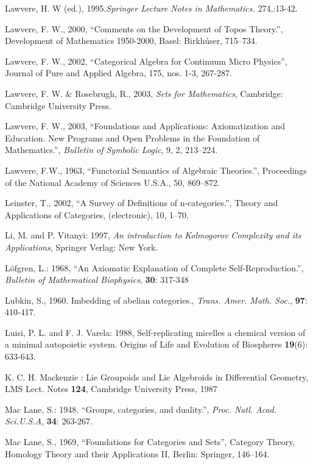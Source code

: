 \documentclass[12pt]{article}
\theoremstyle{plain}
\theoremstyle{definition}
\numberwithin{equation}{section}
\begin{document}
\begin{thebibliography}{99}
Lawvere, H. W (ed.), 1995.{\em Springer Lecture Notes in Mathematics.} 274,:13-42. 

Lawvere, F. W., 2000, ``Comments on the Development of Topos Theory.'', Development of Mathematics 1950-2000, Basel: Birkh\'user, 715--734. 

Lawvere, F. W., 2002, ``Categorical Algebra for Continuum Micro Physics'', Journal of Pure and Applied Algebra, 175, nos. 1-3, 267-287. 

Lawvere, F. W. \& Rosebrugh, R., 2003, {\em Sets for Mathematics}, Cambridge: Cambridge University Press.  

Lawvere, F. W., 2003, ``Foundations and Applications: Axiomatization and Education. New Programs and Open Problems in the Foundation of Mathematics.'', {\em Bulletin of Symbolic Logic}, 9, 2, 213--224. 

Lawvere, F.W., 1963, ``Functorial Semantics of Algebraic Theories.'', Proceedings of the National Academy of Sciences U.S.A., 50, 869--872. 

Leinster, T., 2002, ``A Survey of Definitions of n-categories.'', Theory and Applications of Categories, (electronic), 10, 1--70. 

Li, M. and P. Vitanyi: 1997, \emph{An introduction to Kolmogorov Complexity and its Applications}, Springer Verlag: New York.

L\"{o}fgren,  L.: 1968, ``An Axiomatic Explanation of Complete Self-Reproduction.'', \emph{Bulletin of Mathematical Biophysics}, \textbf{30}: 317-348

Lubkin, S., 1960. Imbedding of abelian categories.,  {\em Trans. Amer. Math. Soc.}, \textbf{97}: 410-417.

Luisi, P. L. and F. J. Varela: 1988, Self-replicating micelles a chemical version of a minimal autopoietic system. Origins of Life and Evolution of Biospheres \textbf{19}(6): 633-643.

K. C. H. Mackenzie : Lie Groupoids and Lie Algebroids in
Differential Geometry, LMS Lect. Notes \textbf{124}, Cambridge
University Press, 1987

Mac Lane, S.: 1948. ``Groups, categories, and duality.'', {\em Proc. Natl. Acad. Sci.U.S.A},
\textbf{34}: 263-267.

Mac Lane, S., 1969, ``Foundations for Categories and Sets'', Category Theory, Homology Theory and their Applications II, Berlin: Springer, 146--164. 


\end{thebibliography}
\end{document}
